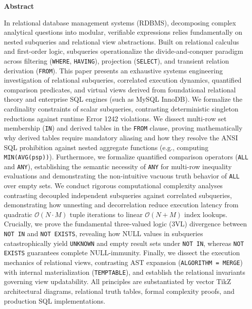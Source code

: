 \documentclass[10pt,twocolumn,letterpaper]{article}
\begin{document}
\begin{center}
  {\bfseries\large Abstract}
\end{center}
\vspace{-0.5em}
{\small In relational database management systems (RDBMS), decomposing complex analytical questions into modular, verifiable expressions relies fundamentally on nested subqueries and relational view abstractions. Built on relational calculus and first-order logic, subqueries operationalize the divide-and-conquer paradigm across filtering (\texttt{WHERE}, \texttt{HAVING}), projection (\texttt{SELECT}), and transient relation derivation (\texttt{FROM}). This paper presents an exhaustive systems engineering investigation of relational subqueries, correlated execution dynamics, quantified comparison predicates, and virtual views derived from foundational relational theory and enterprise SQL engines (such as MySQL InnoDB). We formalize the cardinality constraints of scalar subqueries, contrasting deterministic singleton reductions against runtime Error 1242 violations. We dissect multi-row set membership (\texttt{IN}) and derived tables in the \texttt{FROM} clause, proving mathematically why derived tables require mandatory aliasing and how they resolve the ANSI SQL prohibition against nested aggregate functions (e.g., computing \texttt{MIN(AVG(psp))}). Furthermore, we formalize quantified comparison operators (\texttt{ALL} and \texttt{ANY}), establishing the semantic necessity of \texttt{ANY} for multi-row inequality evaluations and demonstrating the non-intuitive vacuous truth behavior of \texttt{ALL} over empty sets. We conduct rigorous computational complexity analyses contrasting decoupled independent subqueries against correlated subqueries, demonstrating how unnesting and decorrelation reduce execution latency from quadratic $\mathcal{O}(N \cdot M)$ tuple iterations to linear $\mathcal{O}(N + M)$ index lookups. Crucially, we prove the fundamental three-valued logic (3VL) divergence between \texttt{NOT IN} and \texttt{NOT EXISTS}, revealing how NULL values in subqueries catastrophically yield \texttt{UNKNOWN} and empty result sets under \texttt{NOT IN}, whereas \texttt{NOT EXISTS} guarantees complete NULL-immunity. Finally, we dissect the execution mechanics of relational views, contrasting AST expansion (\texttt{ALGORITHM = MERGE}) with internal materialization (\texttt{TEMPTABLE}), and establish the relational invariants governing view updatability. All principles are substantiated by vector TikZ architectural diagrams, relational truth tables, formal complexity proofs, and production SQL implementations.}
\end{document}
